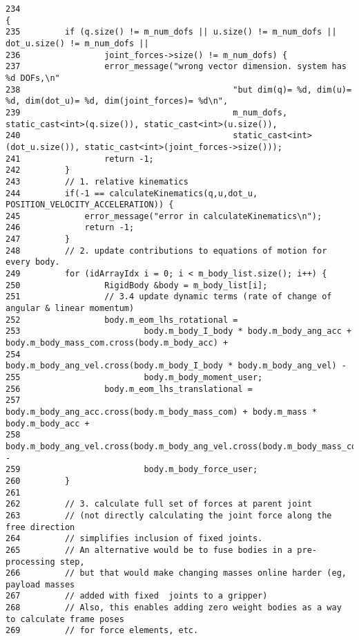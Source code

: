 \begin{Code}\begin{verbatim}234                                                                                                                                                           {
235         if (q.size() != m_num_dofs || u.size() != m_num_dofs || dot_u.size() != m_num_dofs ||
236                 joint_forces->size() != m_num_dofs) {
237                 error_message("wrong vector dimension. system has %d DOFs,\n"
238                                           "but dim(q)= %d, dim(u)= %d, dim(dot_u)= %d, dim(joint_forces)= %d\n",
239                                           m_num_dofs, static_cast<int>(q.size()), static_cast<int>(u.size()),
240                                           static_cast<int>(dot_u.size()), static_cast<int>(joint_forces->size()));
241                 return -1;
242         }
243         // 1. relative kinematics
244         if(-1 == calculateKinematics(q,u,dot_u, POSITION_VELOCITY_ACCELERATION)) {
245             error_message("error in calculateKinematics\n");
246             return -1;
247         }
248         // 2. update contributions to equations of motion for every body.
249         for (idArrayIdx i = 0; i < m_body_list.size(); i++) {
250                 RigidBody &body = m_body_list[i];
251                 // 3.4 update dynamic terms (rate of change of angular & linear momentum)
252                 body.m_eom_lhs_rotational =
253                         body.m_body_I_body * body.m_body_ang_acc + body.m_body_mass_com.cross(body.m_body_acc) +
254                         body.m_body_ang_vel.cross(body.m_body_I_body * body.m_body_ang_vel) -
255                         body.m_body_moment_user;
256                 body.m_eom_lhs_translational =
257                         body.m_body_ang_acc.cross(body.m_body_mass_com) + body.m_mass * body.m_body_acc +
258                         body.m_body_ang_vel.cross(body.m_body_ang_vel.cross(body.m_body_mass_com)) -
259                         body.m_body_force_user;
260         }
261 
262         // 3. calculate full set of forces at parent joint
263         // (not directly calculating the joint force along the free direction
264         // simplifies inclusion of fixed joints.
265         // An alternative would be to fuse bodies in a pre-processing step,
266         // but that would make changing masses online harder (eg, payload masses
267         // added with fixed  joints to a gripper)
268         // Also, this enables adding zero weight bodies as a way to calculate frame poses
269         // for force elements, etc.

\end{verbatim}
\end{Code}
